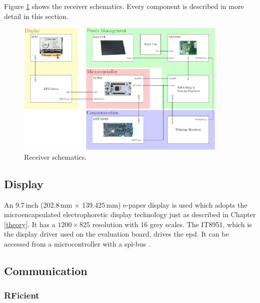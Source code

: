 Figure \ref{hardware:block} shows the receiver schematics.
Every component is described in more detail in this section.

\begin{figure}[ht]
	\centering
	\includegraphics[width=0.9\textwidth]{4-development/hardware/graphics/top/top_schematics.pdf}
	\caption{Receiver schematics.\label{hardware:block}}
\end{figure}

\subsection{Display}
An 9.7\,inch (202.8\,mm $\times$ 139.425\,mm) e-paper display is used which adopts the microencapsulated electrophoretic display technology just as described in Chapter \ref{theory}.
It has a $1200\times 825$ resolution with 16 grey scales.
The IT8951, which is the display driver used on the evaluation board, drives the \acs{epd}. 
It can be accessed from a microcontroller with a \acs{spi}-bus \cite{waveshare}. 

\subsection{Communication}

\subsubsection{RFicient}

